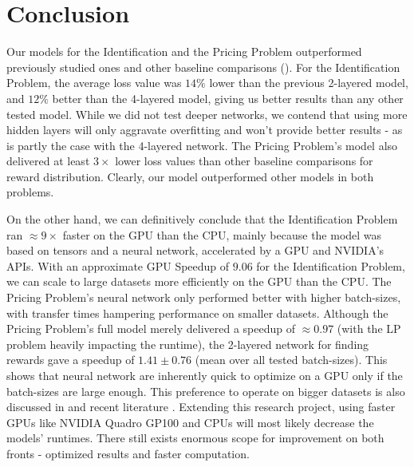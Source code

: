 \chapter{Conclusion} \label{sec:Conclusion}
Our models for the Identification and the Pricing Problem outperformed previously studied ones \cite{Xue2016Avi2} and other baseline comparisons (). For the Identification Problem, the average loss value was $14\%$ lower than the previous 2-layered model, and $12\%$ better than the 4-layered model, giving us better results than any other tested model. While we did not test deeper networks, we contend that using more hidden layers will only aggravate overfitting and won't provide better results - as is partly the case with the 4-layered network. The Pricing Problem's model also delivered at least $3\times$ lower loss values than other baseline comparisons for reward distribution. Clearly, our model outperformed other models in both problems.

On the other hand, we can definitively conclude that the Identification Problem ran $\approx 9\times$ faster on the GPU than the CPU, mainly because the model was based on tensors and a neural network, accelerated by a GPU and NVIDIA's APIs. With an approximate GPU Speedup of $9.06$ for the Identification Problem, we can scale to large datasets more efficiently on the GPU than the CPU. The Pricing Problem's neural network only performed better with higher batch-sizes, with transfer times hampering performance on smaller datasets. Although the Pricing Problem's full model merely delivered a speedup of $\approx 0.97$ (with the LP problem heavily impacting the runtime), the 2-layered network for finding rewards gave a speedup of $1.41\pm0.76$ (mean over all tested batch-sizes). This shows that neural network are inherently quick to optimize on a GPU only if the batch-sizes are large enough. This preference to operate on bigger datasets is also discussed in  and recent literature \cite[Appendix B]{PattersonARM}. Extending this research project, using faster GPUs like NVIDIA Quadro GP100 and CPUs will most likely decrease the models' runtimes. There still exists enormous scope for improvement on both fronts - optimized results and faster computation.

